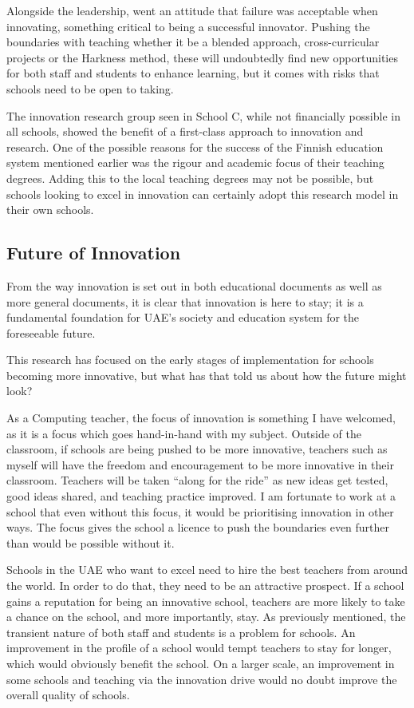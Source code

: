 \documentclass[11pt]{article}
\begin{document}
Alongside the leadership, went an attitude that failure was acceptable when innovating, something critical to being a successful innovator. Pushing the boundaries with teaching whether it be a blended approach, cross-curricular projects or the Harkness method, these will undoubtedly find new opportunities for both staff and students to enhance learning, but it comes with risks that schools need to be open to taking.

The innovation research group seen in School C, while not financially possible in all schools, 
showed the benefit of a first-class approach to innovation and research. One of the possible reasons for the success of the Finnish education system mentioned earlier was the rigour and academic focus of their teaching degrees. Adding this to the local teaching degrees may not be possible, but schools looking to excel in innovation can certainly adopt this research model in their own schools.

\subsection{Future of Innovation}

From the way innovation is set out in both educational documents as well as more general documents, it is clear that innovation is here to stay; it is a fundamental foundation for UAE's society and education system for the foreseeable future.

This research has focused on the early stages of implementation for schools becoming more innovative, but what has that told us about how the future might look?

As a Computing teacher, the focus of innovation is something I have welcomed, as it is a focus which goes hand-in-hand with my subject. Outside of the classroom, if schools are being pushed to be more innovative, teachers such as myself will have the freedom and encouragement to be more innovative in their classroom. Teachers will be taken “along for the ride” as new ideas get tested, good ideas shared, and teaching practice improved. I am fortunate to work at a school that even without this focus, it would be prioritising innovation in other ways. The focus gives the school a licence to push the boundaries even further than would be possible without it. 

Schools in the UAE who want to excel need to hire the best teachers from around the world. In order to do that, they need to be an attractive prospect. If a school gains a reputation for being an innovative school, teachers are more likely to take a chance on the school, and more importantly, stay. As previously mentioned, the transient nature of both staff and students is a problem for schools. An improvement in the profile of a school would tempt teachers to stay for longer, which would obviously benefit the school. On a larger scale, an improvement in some schools and teaching via the innovation drive would no doubt improve the overall quality of schools. 
\end{document}
